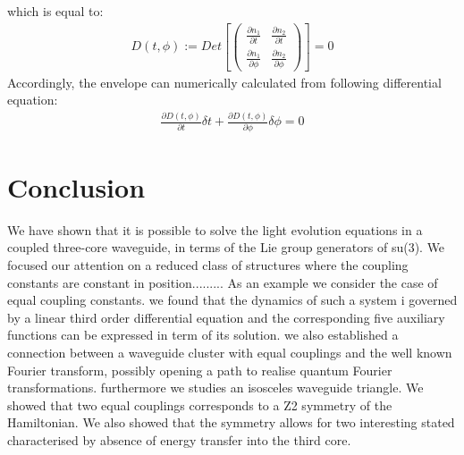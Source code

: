 \documentclass[9pt,twocolumn,twoside]{osajnl}
\begin{document}
which is equal to:
\begin{eqnarray}
D(t, \phi):=Det[\left(  \begin{array}{cc} 
\frac{\partial n_1}{\partial t} & \frac{\partial n_2}{\partial t} \\
\frac{\partial n_1}{\partial \phi} & \frac{\partial n_2}{\partial \phi} 
\end{array} \right)] = 0
\end{eqnarray}
Accordingly, the envelope can numerically
calculated from following differential equation:
\begin{eqnarray}
\frac{\partial D(t,\phi)}{\partial t} \delta t +
\frac{\partial D(t,\phi)}{\partial \phi} \delta \phi = 0
\end{eqnarray}




\section{Conclusion}
We have shown that it is possible to solve the light evolution
equations in a coupled three-core waveguide, in terms of
the Lie group generators of su(3). We focused our attention on a
reduced class of structures where the coupling constants
are constant in position......... As an
example we consider the case of equal coupling constants.
we found that the dynamics of such a system i 
governed by a linear third order differential equation and the
corresponding five auxiliary functions can be expressed in term of its solution.
we also established a connection between a waveguide cluster
with equal couplings and the well known Fourier transform, possibly opening
a path to realise quantum Fourier transformations.
furthermore we studies an isosceles waveguide triangle.
We showed that two equal couplings corresponds to
a Z2 symmetry of the Hamiltonian. We also showed 
that the symmetry allows for two interesting stated
characterised by absence of energy transfer into the 
third core.









\end{document}
